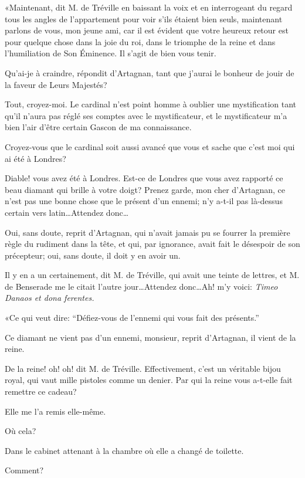 «Maintenant, dit M. de Tréville en baissant la voix et en interrogeant du regard tous les angles de l'appartement pour voir s'ils étaient bien seuls, maintenant parlons de vous, mon jeune ami, car il est évident que votre heureux retour est pour quelque chose dans la joie du roi, dans le triomphe de la reine et dans l'humiliation de Son Éminence. Il s'agit de bien vous tenir. 

\speak  Qu'ai-je à craindre, répondit d'Artagnan, tant que j'aurai le bonheur de jouir de la faveur de Leurs Majestés? 

\speak  Tout, croyez-moi. Le cardinal n'est point homme à oublier une mystification tant qu'il n'aura pas réglé ses comptes avec le mystificateur, et le mystificateur m'a bien l'air d'être certain Gascon de ma connaissance. 

\speak  Croyez-vous que le cardinal soit aussi avancé que vous et sache que c'est moi qui ai été à Londres? 

\speak  Diable! vous avez été à Londres. Est-ce de Londres que vous avez rapporté ce beau diamant qui brille à votre doigt? Prenez garde, mon cher d'Artagnan, ce n'est pas une bonne chose que le présent d'un ennemi; n'y a-t-il pas là-dessus certain vers latin\dots Attendez donc\dots 

\speak  Oui, sans doute, reprit d'Artagnan, qui n'avait jamais pu se fourrer la première règle du rudiment dans la tête, et qui, par ignorance, avait fait le désespoir de son précepteur; oui, sans doute, il doit y en avoir un. 

\speak  Il y en a un certainement, dit M. de Tréville, qui avait une teinte de lettres, et M. de Benserade me le citait l'autre jour\dots Attendez donc\dots Ah! m'y voici: \textit{Timeo Danaos et dona ferentes.} 

«Ce qui veut dire: “Défiez-vous de l'ennemi qui vous fait des présents.” 

\speak  Ce diamant ne vient pas d'un ennemi, monsieur, reprit d'Artagnan, il vient de la reine. 

\speak  De la reine! oh! oh! dit M. de Tréville. Effectivement, c'est un véritable bijou royal, qui vaut mille pistoles comme un denier. Par qui la reine vous a-t-elle fait remettre ce cadeau? 

\speak  Elle me l'a remis elle-même. 

\speak  Où cela? 

\speak  Dans le cabinet attenant à la chambre où elle a changé de toilette. 

\speak  Comment? 

